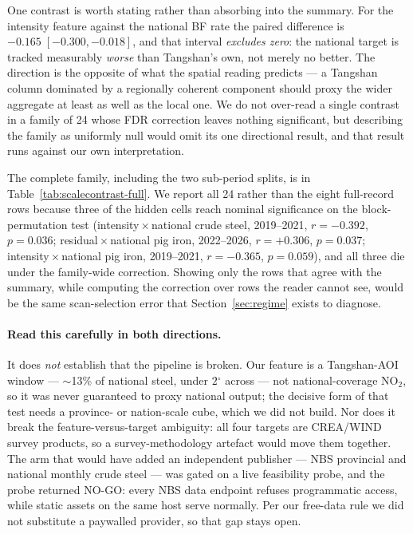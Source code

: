 \documentclass[11pt,a4paper]{article}
\providecommand{\degree}{\ensuremath{^{\circ}}}
\newcommand{\rval}[1]{\mbox{$r=#1$}}
\providecommand{\ce}[1]{\ensuremath{\mathrm{#1}}}
\begin{document}
One contrast is worth stating rather than absorbing into the summary. For the intensity feature
against the national BF rate the paired difference is $-0.165\;[-0.300,-0.018]$, and that interval
\emph{excludes zero}: the national target is tracked measurably \emph{worse} than Tangshan's own,
not merely no better. The direction is the opposite of what the spatial reading predicts --- a
Tangshan column dominated by a regionally coherent component should proxy the wider aggregate at
least as well as the local one. We do not over-read a single contrast in a family of 24 whose FDR
correction leaves nothing significant, but describing the family as uniformly null would omit its
one directional result, and that result runs against our own interpretation.

The complete family, including the two sub-period splits, is in
Table~\ref{tab:scalecontrast-full}. We report all 24 rather than the eight full-record rows
because three of the hidden cells reach nominal significance on the block-permutation test
(intensity\,$\times$\,national crude steel, 2019--2021, \rval{-0.392}, $p=0.036$;
residual\,$\times$\,national pig iron, 2022--2026, \rval{+0.306}, $p=0.037$;
intensity\,$\times$\,national pig iron, 2019--2021, \rval{-0.365}, $p=0.059$), and all three die
under the family-wide correction. Showing only the rows that agree with the summary, while
computing the correction over rows the reader cannot see, would be the same scan-selection error
that Section~\ref{sec:regime} exists to diagnose.

\paragraph{Read this carefully in both directions.} It does \emph{not} establish that the pipeline
is broken. Our feature is a Tangshan-AOI window --- $\sim$13\% of national steel, under
$2\degree$ across --- not national-coverage \ce{NO_2}, so it was never guaranteed to proxy national
output; the decisive form of that test needs a province- or nation-scale cube, which we did not
build. Nor does it break the feature-versus-target ambiguity: all four targets are CREA/WIND
survey products, so a survey-methodology artefact would move them together. The arm that would have
added an independent publisher --- NBS provincial and national monthly crude steel --- was gated on
a live feasibility probe, and the probe returned NO-GO: every NBS data endpoint refuses
programmatic access, while static assets on the same host serve normally. Per our free-data rule we
did not substitute a paywalled provider, so that gap stays open.
\end{document}
